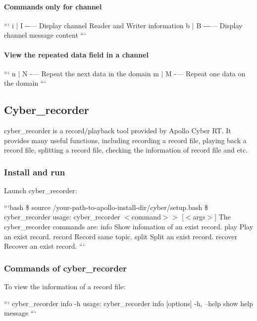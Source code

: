 \paragraph*{Commands only for channel}

``` i $\vert$ I -\/-\/--- Display channel Reader and Writer information b $\vert$ B -\/-\/-\/--- Display channel message content ```

\paragraph*{View the repeated data field in a channel}

``` n $\vert$ N -\/--- Repeat the next data in the domain m $\vert$ M -\/--- Repeat one data on the domain ```

\subsection*{Cyber\-\_\-recorder}

{\ttfamily cyber\-\_\-recorder} is a record/playback tool provided by Apollo Cyber R\-T. It provides many useful functions, including recording a record file, playing back a record file, splitting a record file, checking the information of record file and etc.

\subsubsection*{Install and run}

Launch cyber\-\_\-recorder\-:

```bash \$ source /your-\/path-\/to-\/apollo-\/install-\/dir/cyber/setup.bash \$ cyber\-\_\-recorder usage\-: cyber\-\_\-recorder $<$command$>$$>$ \mbox{[}$<$args$>$\mbox{]} The cyber\-\_\-recorder commands are\-: info Show infomation of an exist record. play Play an exist record. record Record same topic. split Split an exist record. recover Recover an exist record. ```

\subsubsection*{Commands of cyber\-\_\-recorder}


\begin{DoxyItemize}
\item To view the information of a record file\-:
\end{DoxyItemize}

``` cyber\-\_\-recorder info -\/h usage\-: cyber\-\_\-recorder info \mbox{[}options\mbox{]} -\/h, --help show help message ```


